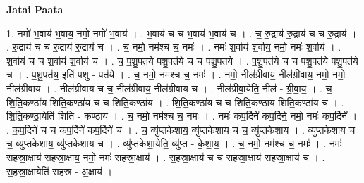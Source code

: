 \documentclass[17pt]{extarticle}
\begin{document}
\textbf{Jatai Paata} \newline

1. नमो॑ भ॒वाय॑ भ॒वाय॒ नमो॒ नमो॑ भ॒वाय॑ । . भ॒वाय॑ च च भ॒वाय॑ भ॒वाय॑ च । . च॒ रु॒द्राय॑ रु॒द्राय॑ च च रु॒द्राय॑ । . रु॒द्राय॑ च च रु॒द्राय॑ रु॒द्राय॑ च । . च॒ नमो॒ नम॑श्च च॒ नमः॑ । . नमः॑ श॒र्वाय॑ श॒र्वाय॒ नमो॒ नमः॑ श॒र्वाय॑ । . श॒र्वाय॑ च च श॒र्वाय॑ श॒र्वाय॑ च । . च॒ प॒शु॒पत॑ये पशु॒पत॑ये च च पशु॒पत॑ये । . प॒शु॒पत॑ये च च पशु॒पत॑ये पशु॒पत॑ये च । . प॒शु॒पत॑य॒ इति॑ पशु - पत॑ये । . च॒ नमो॒ नम॑श्च च॒ नमः॑ । . नमो॒ नील॑ग्रीवाय॒ नील॑ग्रीवाय॒ नमो॒ नमो॒ नील॑ग्रीवाय । . नील॑ग्रीवाय च च॒ नील॑ग्रीवाय॒ नील॑ग्रीवाय च । . नील॑ग्रीवा॒येति॒ नील॑ - ग्री॒वा॒य॒ । . च॒ शि॒ति॒कण्ठा॑य शिति॒कण्ठा॑य च च शिति॒कण्ठा॑य । . शि॒ति॒कण्ठा॑य च च शिति॒कण्ठा॑य शिति॒कण्ठा॑य च । . शि॒ति॒कण्ठा॒येति॑ शिति - कण्ठा॑य । . च॒ नमो॒ नम॑श्च च॒ नमः॑ । . नमः॑ कप॒र्दिने॑ कप॒र्दिने॒ नमो॒ नमः॑ कप॒र्दिने᳚ । . क॒प॒र्दिने॑ च च कप॒र्दिने॑ कप॒र्दिने॑ च । . च॒ व्यु॑प्तकेशाय॒ व्यु॑प्तकेशाय च च॒ व्यु॑प्तकेशाय । . व्यु॑प्तकेशाय च च॒ व्यु॑प्तकेशाय॒ व्यु॑प्तकेशाय च । . व्यु॑प्तकेशा॒येति॒ व्यु॑प्त - के॒शा॒य॒ । . च॒ नमो॒ नम॑श्च च॒ नमः॑ । . नमः॑ सहस्रा॒क्षाय॑ सहस्रा॒क्षाय॒ नमो॒ नमः॑ सहस्रा॒क्षाय॑ । . स॒ह॒स्रा॒क्षाय॑ च च सहस्रा॒क्षाय॑ सहस्रा॒क्षाय॑ च । . स॒ह॒स्रा॒क्षायेति॑ सहस्र - अ॒क्षाय॑ । \newline
\end{document}
